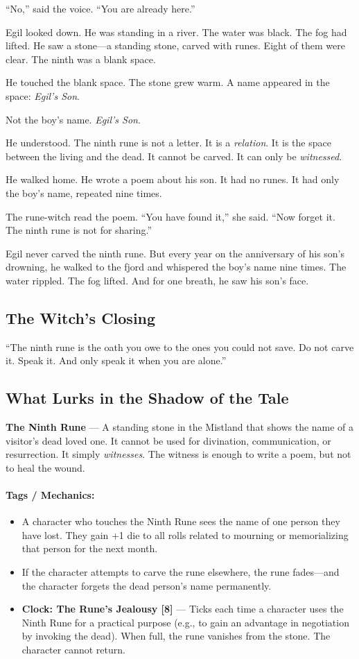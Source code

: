 \documentclass[9pt,a5paper]{extbook}
\begin{document}
``No,'' said the voice. ``You are already here.''

Egil looked down. He was standing in a river. The water was black. The fog had lifted. He saw a stone---a standing stone, carved with runes. Eight of them were clear. The ninth was a blank space.

He touched the blank space. The stone grew warm. A name appeared in the space: \textit{Egil's Son}.

Not the boy's name. \textit{Egil's Son}.

He understood. The ninth rune is not a letter. It is a \textit{relation}. It is the space between the living and the dead. It cannot be carved. It can only be \textit{witnessed}.

He walked home. He wrote a poem about his son. It had no runes. It had only the boy's name, repeated nine times.

The rune-witch read the poem. ``You have found it,'' she said. ``Now forget it. The ninth rune is not for sharing.''

Egil never carved the ninth rune. But every year on the anniversary of his son's drowning, he walked to the fjord and whispered the boy's name nine times. The water rippled. The fog lifted. And for one breath, he saw his son's face.

\subsection*{The Witch's Closing}

``The ninth rune is the oath you owe to the ones you could not save. Do not carve it. Speak it. And only speak it when you are alone.''

\subsection*{What Lurks in the Shadow of the Tale}

\textbf{The Ninth Rune} --- A standing stone in the Mistland that shows the name of a visitor's dead loved one. It cannot be used for divination, communication, or resurrection. It simply \textit{witnesses}. The witness is enough to write a poem, but not to heal the wound.

\paragraph{Tags / Mechanics:}
\begin{itemize}
    \item A character who touches the Ninth Rune sees the name of one person they have lost. They gain +1 die to all rolls related to mourning or memorializing that person for the next month.
    \item If the character attempts to carve the rune elsewhere, the rune fades---and the character forgets the dead person's name permanently.
    \item \textbf{Clock: The Rune's Jealousy [8]} --- Ticks each time a character uses the Ninth Rune for a practical purpose (e.g., to gain an advantage in negotiation by invoking the dead). When full, the rune vanishes from the stone. The character cannot return.
\end{itemize}
\end{document}
